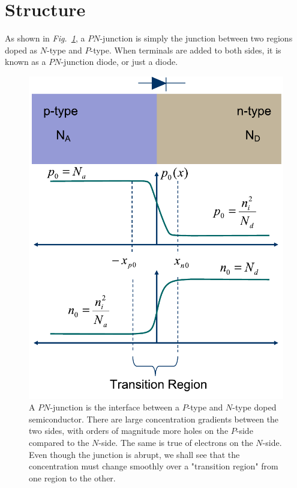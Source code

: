 \section{Structure}
As shown in \emph{Fig.~\ref{fig:slide2}}, a $PN$-junction is simply the junction between two regions doped as $N$-type and $P$-type.  When terminals are added to both sides, it is known as a $PN$-junction diode, or just a diode.
\begin{figure}[tb]
\centering
\includegraphics[width=.5\columnwidth]{slide2}
\caption{A $PN$-junction is the interface between a $P$-type and $N$-type doped semiconductor.  There are large concentration gradients between the two sides, with orders of magnitude more holes on the $P$-side compared to the $N$-side.  The same is true of electrons on the $N$-side.  Even though the junction is abrupt, we shall see that the concentration must change smoothly over a "transition region" from one region to the other.}
\label{fig:slide2}
\end{figure}
